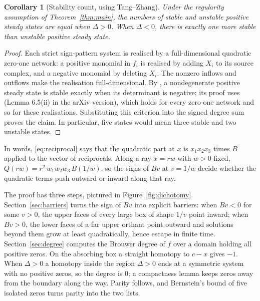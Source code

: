 \documentclass[11pt]{article}
\newtheorem{corollary}[theorem]{Corollary}
\theoremstyle{remark}\newtheorem{remark}[theorem]{Remark}
\begin{document}
\begin{corollary}[Stability count, using Tang--Zhang]\label{cor:stability}
Under the regularity assumption of Theorem~\ref{thm:main}, the numbers of stable
and unstable positive steady states are equal when $\Delta>0$. When $\Delta<0$,
there is exactly one more stable than unstable positive steady state.
\end{corollary}
\begin{proof}
Each strict sign-pattern system is realised by a full-dimensional quadratic
zero-one network: a positive monomial in $f_i$ is realised by adding $X_i$ to
its source complex, and a negative monomial by deleting $X_i$. The nonzero
inflows and outflows make the realisation full-dimensional. By \cite[Lemma 3]{TZ},
a nondegenerate positive steady state is stable exactly when its determinant
is negative; its proof uses \cite[Lemma 6.6(ii)]{TW} (Lemma 6.5(ii) in the arXiv
version), which holds for every zero-one network and so for these realisations.
Substituting this criterion into the signed degree sum proves the
claim. In particular, five states would mean three stable and two unstable states.
\end{proof}

In words, \eqref{eq:reciprocal} says that the quadratic part at $x$ is
$x_1x_2x_3$ times $B$ applied to the vector of reciprocals. Along a ray $x=rw$ with
$w>0$ fixed, $Q(rw)=r^2\,w_1w_2w_3\,B(1/w)$, so the signs of $Bv$ at $v=1/w$ decide
whether the quadratic terms push outward or inward along that ray.

The proof has three steps, pictured in Figure~\ref{fig:dichotomy}.
Section~\ref{sec:barriers} turns the sign of $Bv$ into explicit barriers: when
$Bv<0$ for some $v>0$, the upper faces of every large box of shape $1/v$ point
inward; when $Bv>0$, the lower faces of a far upper orthant point outward and
solutions beyond them grow at least quadratically, hence escape in finite time.
Section~\ref{sec:degree} computes the Brouwer degree of $f$ over a domain holding
all positive zeros. On the absorbing box a straight homotopy to $c-x$ gives $-1$.
When $\Delta>0$ a homotopy inside the region $\Delta>0$ ends at a symmetric system
with no positive zeros, so the degree is $0$; a compactness lemma keeps zeros
away from the boundary along the way. Parity follows, and Bernstein's bound of
five isolated zeros turns parity into the two lists.
\end{document}

